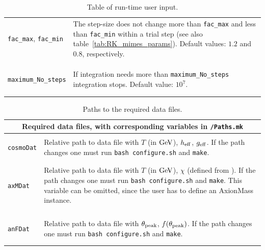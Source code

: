\documentclass[11pt,a4paper]{article}
\begin{document}
\begin{table}[h!]
\begin{tabular}{l l}
		{\tt fac\_max}, {\tt fac\_min} &\multirow{1}{12cm}{The step-size does not change more than {\tt fac\_max} and less than {\tt fac\_min} within a trial step (see also table~\ref{tab:RK_mimes_params}). Default values: $1.2$ and $0.8$, respectively.} \\ \\ \\ 
		\hline\\[-0.4cm]
		
		{\tt maximum\_No\_steps} & \multirow{1}{12cm}{If integration needs more than {\tt maximum\_No\_steps} integration stops. Default value: $10^7$.}\\\\
		\hline\\[-0.4cm]
	\end{tabular}
	\caption{Table of run-time user input.}
	\label{tab:run_time-input}
\end{table}
		
\begin{table}[h!]
	\centering
	\begin{tabular}{l l}
		\multicolumn{2}{c}{\bf Required data files, with corresponding variables in {\tt \mimes/Paths.mk}}  \\
		\hline\\[-0.4cm]
	
		{\tt cosmoDat}& \multirow{1}{12cm}{Relative path to data file with $T$ (in ${\rm GeV}$), $h_{\rm eff}{}$, $g_{\rm eff}{}$. If the path changes one must run
		{\tt bash configure.sh} and {\tt make}.}\\\\		
		\hline\\[-0.4cm]

		{\tt axMDat}& \multirow{1}{12cm}{Relative path to data file with $T$ (in ${\rm GeV}$), $\chi$ (defined from \eqs{eq:axion_mass_def}). If the path changes one must run {\tt bash configure.sh} and {\tt make}. This variable can be omitted, since the user has to define an AxionMass instance.}\\\\\\\\		
		\hline\\[-0.4cm]
		
		{\tt anFDat}& \multirow{1}{12cm}{Relative path to data file with $\theta_{\rm peak}{}$, $f(\theta_{\rm peak}{})$. If the path changes one must run
		{\tt bash configure.sh} and {\tt make}.}\\\\		
		\hline\\[-0.4cm]



	\end{tabular}
	\caption{Paths to the required data files.}
\label{tab:input}
\end{table}
\end{document}
